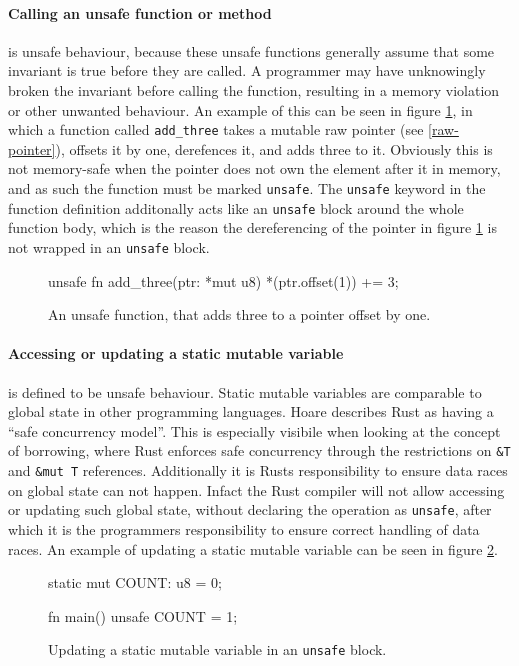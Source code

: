 \documentclass[twocolumn]{article}
\begin{document}
\paragraph{Calling an unsafe function or method} is unsafe behaviour, because these unsafe functions generally assume that some invariant is true before they are called.
A programmer may have unknowingly broken the invariant before calling the function, resulting in a memory violation or other unwanted behaviour.
An example of this can be seen in figure \ref{unsafe-function}, in which a function called \texttt{add_three} takes a mutable raw pointer (see \ref{raw-pointer}), offsets it by one, derefences it, and adds three to it.
Obviously this is not memory-safe when the pointer does not own the element after it in memory, and as such the function must be marked \texttt{unsafe}.
The \texttt{unsafe} keyword in the function definition additonally acts like an \texttt{unsafe} block around the whole function body, which is the reason the dereferencing of the pointer in figure \ref{unsafe-function} is not wrapped in an \texttt{unsafe} block.
\begin{figure}
\begin{rustcode}
unsafe fn add_three(ptr: *mut u8) {
        *(ptr.offset(1)) += 3;
}
\end{rustcode}
\vspace{-2em}
\caption{An unsafe function, that adds three to a pointer offset by one.}
\label{unsafe-function}
\end{figure}
\paragraph{Accessing or updating a static mutable variable} is defined to be unsafe behaviour.
Static mutable variables are comparable to global state in other programming languages.
Hoare describes Rust as having a ``safe concurrency model''\cite{HoareInterview}.
This is especially visibile when looking at the concept of borrowing, where Rust enforces safe concurrency through the restrictions on \texttt{&T} and \texttt{&mut T} references.
Additionally it is Rusts responsibility to ensure data races on global state can not happen.
Infact the Rust compiler will not allow accessing or updating such global state, without declaring the operation
as \texttt{unsafe}, after which it is the programmers responsibility to ensure correct handling of data races.
An example of updating a static mutable variable can be seen in figure \ref{unsafe-staticmut}.
\begin{figure}
\begin{rustcode}
static mut COUNT: u8 = 0;

fn main() {
    unsafe {
        COUNT = 1;
    }
}
\end{rustcode}
\vspace{-2em}
\caption{Updating a static mutable variable in an \texttt{unsafe} block.}
\label{unsafe-staticmut}
\end{figure}
\end{document}
